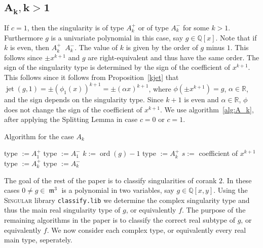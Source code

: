 \documentclass[noend]{amsproc}
\DeclareMathOperator{\ord}{ord}
\DeclareMathOperator{\requiv}{\overset{r}{\sim}}
\DeclareMathOperator{\m}{\mathfrak{m}}
\DeclareMathOperator{\jet}{jet}
\begin{document}
\subsection{$\boldsymbol{A_k, k > 1}$}
If $c=1$, then the singularity is of type
$A_k^+$ or of type $A_k^-$ for some $k>1$. Furthermore $g$ is a univariate
polynomial in this case, say $g\in\mathbb Q[x]$. Note that if $k$ is even, then
$A_k^+\requiv A_k^-$. The value of $k$ is given by the order of $g$ minus $1$.
This follows since $\pm x^{k+1}$ and $g$ are right-equivalent and thus have the
same order. The sign of the singularity type is determined by the sign of the
coefficient of $x^{k+1}$. This follows since it follows from
Proposition~\ref{kjet}
that $\jet(g,1)=\pm(\phi_1(x))^{k+1}=\pm(\alpha x)^{k+1}$, where $\phi(\pm
x^{k+1})=g$, $\alpha\in\mathbb R$, and the sign depends on the singularity
type.  Since $k+1$ is even and $\alpha\in\mathbb R$, $\phi$ does not change the
sign of the coefficient of $x^{k+1}$. We use algorithm~\ref{alg:A_k}, after
applying the Splitting Lemma in case $c=0$ or $c=1$.

\begin{algorithm}[h]
\caption{\label{alg:A_k} Algorithm for the case $A_k$}
\begin{algorithmic}[1]



\STATE type $:=A_1^+$
\ELSE
\STATE type $:=A_1^-$
\ENDIF
\ENDIF
{}
\STATE $k:= \ord(g)-1$
\STATE type $:=A_k^+$
\ELSE
\STATE $s:=$ coefficient of $x^{k+1}$
\STATE type $:=A_k^+$
\ELSE
\STATE type $:=A_k^-$
\ENDIF
\ENDIF
\ENDIF
{}

\end{algorithmic}
\end{algorithm}

The goal of the rest of the paper is to classify singularities of corank $2$.
In these cases $0\neq g\in\m^3$ is a polynomial in two variables, say
$g\in\mathbb Q[x,y]$. Using the \textsc{Singular} library {\tt classify.lib} we
determine the complex singularity type and thus the main real singularity type
of $g$, or equivalently $f$. The purpose of the remaining algorithms in the
paper is to classify the correct real subtype of $g$, or equivalently $f$. We
now consider each complex type, or equivalently every real main type,
seperately.
\end{document}
